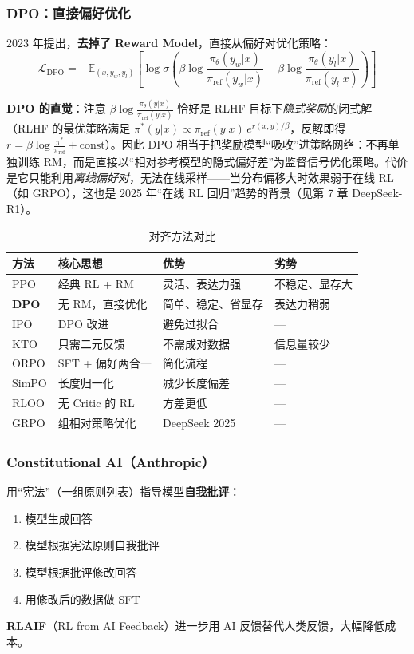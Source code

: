 \documentclass[12pt,a4paper]{article}
\begin{document}
\subsubsection{DPO：直接偏好优化}

2023 年提出，\textbf{去掉了 Reward Model}，直接从偏好对优化策略：
\[
\mathcal{L}_{\text{DPO}} = -\mathbb{E}_{(x, y_w, y_l)} \left[ \log \sigma\!\left( \beta \log \frac{\pi_\theta(y_w|x)}{\pi_{\text{ref}}(y_w|x)} - \beta \log \frac{\pi_\theta(y_l|x)}{\pi_{\text{ref}}(y_l|x)} \right) \right]
\]

\textbf{DPO 的直觉}：注意 $\beta \log \frac{\pi_\theta(y|x)}{\pi_{\text{ref}}(y|x)}$ 恰好是 RLHF 目标下\emph{隐式奖励}的闭式解（RLHF 的最优策略满足 $\pi^*(y|x) \propto \pi_{\text{ref}}(y|x)\, e^{r(x,y)/\beta}$，反解即得 $r = \beta \log \frac{\pi^*}{\pi_{\text{ref}}} + \text{const}$）。因此 DPO 相当于把奖励模型“吸收”进策略网络：不再单独训练 RM，而是直接以“相对参考模型的隐式偏好差”为监督信号优化策略。代价是它只能利用\emph{离线偏好对}，无法在线采样——当分布偏移大时效果弱于在线 RL（如 GRPO），这也是 2025 年“在线 RL 回归”趋势的背景（见第 7 章 DeepSeek-R1）。

\begin{table}[htbp]
\centering
\small
\begin{tabular}{@{}llll@{}}
\toprule
\textbf{方法} & \textbf{核心思想} & \textbf{优势} & \textbf{劣势}\\
\midrule
PPO & 经典 RL + RM & 灵活、表达力强 & 不稳定、显存大\\
\textbf{DPO} & 无 RM，直接优化 & 简单、稳定、省显存 & 表达力稍弱\\
IPO & DPO 改进 & 避免过拟合 & —\\
KTO & 只需二元反馈 & 不需成对数据 & 信息量较少\\
ORPO & SFT + 偏好两合一 & 简化流程 & —\\
SimPO & 长度归一化 & 减少长度偏差 & —\\
RLOO & 无 Critic 的 RL & 方差更低 & —\\
GRPO & 组相对策略优化 & DeepSeek 2025 & —\\
\bottomrule
\end{tabular}
\caption{对齐方法对比}
\end{table}

\subsubsection{Constitutional AI（Anthropic）}

用“宪法”（一组原则列表）指导模型\textbf{自我批评}：
\begin{enumerate}
  \item 模型生成回答
  \item 模型根据宪法原则自我批评
  \item 模型根据批评修改回答
  \item 用修改后的数据做 SFT
\end{enumerate}
\textbf{RLAIF}（RL from AI Feedback）进一步用 AI 反馈替代人类反馈，大幅降低成本。
\end{document}
